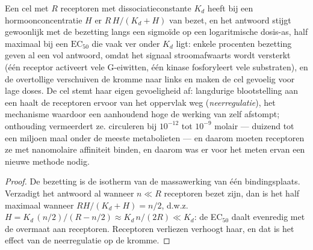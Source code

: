 \begin{proposition}\label{prop:b3:endocrinology:dose}
Een cel met $R$ receptoren met dissociatieconstante $K_{d}$ heeft bij
een hormoonconcentratie $H$ er $R\,H/(K_{d} + H)$ van bezet, en het
antwoord stijgt gewoonlijk met de bezetting langs een sigmoïde op een
logaritmische dosis-as, half maximaal bij een $\text{EC}_{50}$ die vaak
ver onder $K_{d}$ ligt: enkele procenten bezetting geven al een vol
antwoord, omdat het signaal stroomafwaarts wordt versterkt (één
receptor activeert vele G-eiwitten, één kinase fosforyleert vele
substraten), en de overtollige \emph{} verschuiven de
kromme naar links en maken de cel gevoelig voor lage doses. De cel
stemt haar eigen gevoeligheid af: langdurige blootstelling aan een
 haalt de receptoren ervoor van het oppervlak weg
(\emph{neerregulatie}), het mechanisme waardoor een aanhoudend hoge
 de werking van  zelf afstompt; onthouding vermeerdert
ze.  circuleren bij $10^{-12}$ tot $10^{-9}$ molair --- duizend
tot een miljoen maal onder de meeste metabolieten --- en daarom moeten
receptoren ze met nanomolaire affiniteit binden, en daarom was er voor
het meten ervan een nieuwe methode nodig.
\end{proposition}
\begin{proof}
De bezetting is de isotherm van de massawerking van één bindingsplaats.
Verzadigt het antwoord al wanneer $n \ll R$ receptoren bezet zijn, dan
is het half maximaal wanneer $R H/(K_{d} + H) = n/2$, d.w.z.\ $H = K_{d}\,
(n/2)/(R - n/2) \approx K_{d}\, n/(2R) \ll K_{d}$: de EC$_{50}$ daalt
evenredig met de overmaat aan receptoren. Receptoren verliezen verhoogt
haar, en dat is het effect van de neerregulatie op de kromme.
\end{proof}

